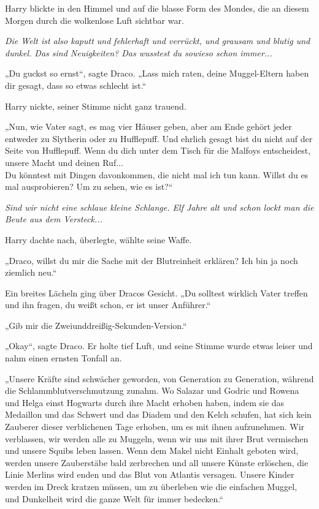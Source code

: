 {Harry blickte in den Himmel und auf die blasse Form des Mondes, die an diesem Morgen durch die wolkenlose Luft sichtbar war.

\emph{Die Welt ist also kaputt und fehlerhaft und verrückt, und grausam und blutig und dunkel. Das sind Neuigkeiten? Das wusstest du sowieso schon immer...}

„Du guckst so ernst“, sagte Draco. „Lass mich raten, deine Muggel-Eltern haben dir gesagt, dass so etwas schlecht ist.“

Harry nickte, seiner Stimme nicht ganz trauend.

„Nun, wie Vater sagt, es mag vier Häuser geben, aber am Ende gehört jeder entweder zu Slytherin oder zu Hufflepuff. Und ehrlich gesagt bist du nicht auf der Seite von Hufflepuff. Wenn du dich unter dem Tisch für die Malfoys entscheidest, unsere Macht und deinen Ruf...\\ Du könntest mit Dingen davonkommen, die nicht mal ich tun kann. Willst du es mal ausprobieren? Um zu sehen, wie es ist?“

\emph{Sind wir nicht eine schlaue kleine Schlange. Elf Jahre alt und schon lockt man die Beute aus dem Versteck...}

Harry dachte nach, überlegte, wählte seine Waffe.

„Draco, willst du mir die Sache mit der Blutreinheit erklären? Ich bin ja noch ziemlich neu.“

Ein breites Lächeln ging über Dracos Gesicht. „Du solltest wirklich Vater treffen und ihn fragen, du weißt schon, er ist unser Anführer.“

„Gib mir die Zweiunddreißig-Sekunden-Version.“

„Okay“, sagte Draco. Er holte tief Luft, und seine Stimme wurde etwas leiser und nahm einen ernsten Tonfall an.

„Unsere Kräfte sind schwächer geworden, von Generation zu Generation, während die Schlammblutverschmutzung zunahm. Wo Salazar und Godric und Rowena und Helga einst Hogwarts durch ihre Macht erhoben haben, indem sie das Medaillon und das Schwert und das Diadem und den Kelch schufen, hat sich kein Zauberer dieser verblichenen Tage erhoben, um es mit ihnen aufzunehmen. Wir verblassen, wir werden alle zu Muggeln, wenn wir uns mit ihrer Brut vermischen und unsere Squibs leben lassen. Wenn dem Makel nicht Einhalt geboten wird, werden unsere Zauberstäbe bald zerbrechen und all unsere Künste erlöschen, die Linie Merlins wird enden und das Blut von Atlantis versagen. Unsere Kinder werden im Dreck kratzen müssen, um zu überleben wie die einfachen Muggel, und Dunkelheit wird die ganze Welt für immer bedecken.“

}
